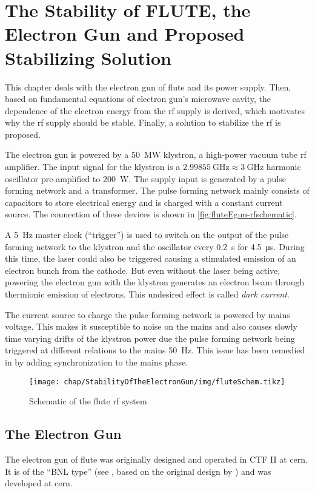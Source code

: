 \chapter{The Stability of FLUTE, the Electron Gun and Proposed Stabilizing Solution}
This chapter deals with the electron gun of \gls{flute} and its power supply. Then, based on fundamental equations of electron gun's microwave cavity, the dependence of the electron energy from the \gls{rf} supply is derived, which motivates why the \gls{rf} supply should be stable. Finally, a solution to stabilize the \gls{rf} is proposed.

The electron gun is powered by a \SI{50}{\MW} klystron, a high-power vacuum tube \gls{rf} amplifier. The input signal for the klystron is a $\SI{2.99855}{\GHz}\approx\SI{3}{\GHz}$ harmonic oscillator pre-amplified to \SI{200}{\watt}. The supply input is generated by a pulse forming network and a transformer. The pulse forming network mainly consists of capacitors to store electrical energy and is charged with a constant current source. The connection of these devices is shown in \autoref{fig:fluteEgun-rfschematic}.

A \SI{5}{\hertz} master clock (``trigger'') is used to switch on the output of the pulse forming network to the klystron and the oscillator every \SI{0.2}{\second} for \SI{4.5}{\micro\second}. During this time, the laser could also be triggered causing a stimulated emission of an electron bunch from the cathode. But even without the laser being active, powering the electron gun with the klystron generates an electron beam through thermionic emission of electrons. This undesired effect is called \textit{dark current}.

The current source to charge the pulse forming network is powered by mains voltage. This makes it susceptible to noise on the mains and also causes slowly time varying drifts of the klystron power due the pulse forming network being triggered at different relations to the mains \SI{50}{\hertz}. This issue has been remedied in \cite{Nasse2019} by adding synchronization to the mains phase.

\begin{figure}[tbh]
	\centering
	\texttt{[image: chap/StabilityOfTheElectronGun/img/fluteSchem.tikz]}
	\caption[FLUTE RF schematic]{Schematic of the \gls{flute} \gls{rf} system}
	\label{fig:fluteEgun-rfschematic}
\end{figure}

\section{The Electron Gun}
The electron gun of \gls{flute} was originally designed and operated in CTF II at \gls{cern}. \cite{Schuh2014}
It is of the ``BNL type'' (see \cite{Batchelor1988}, based on the original design by \cite{fraser1987}) and was  developed at \gls{cern}. \cite{Bossart:288412}

